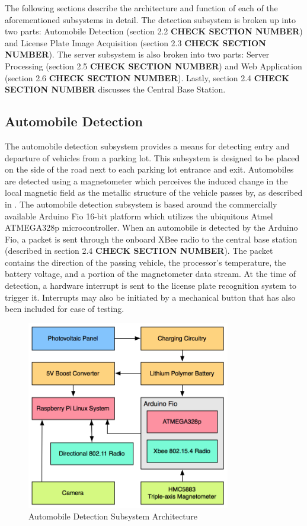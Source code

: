 \documentclass[11pt, oneside, fullpage, doublespace]{article}
\begin{document}
The following sections describe the architecture and function of each of the aforementioned subsystems in detail. The detection subsystem is broken up into two parts: Automobile Detection (section 2.2 \textbf{\color{red} CHECK SECTION NUMBER}) and License Plate Image Acquisition (section 2.3 \textbf{\color{red} CHECK SECTION NUMBER}). The server subsystem is also broken into two parts: Server Processing (section 2.5 \textbf{\color{red} CHECK SECTION NUMBER}) and Web Application (section 2.6 \textbf{\color{red} CHECK SECTION NUMBER}). Lastly, section 2.4 \textbf{\color{red} CHECK SECTION NUMBER} discusses the Central Base Station.

\subsection{Automobile Detection}
The automobile detection subsystem provides a means for detecting entry and departure of vehicles from a parking lot. This subsystem is designed to be placed on the side of the road next to each parking lot entrance and exit. Automobiles are detected using a magnetometer which perceives the induced change in the local magnetic field as the metallic structure of the vehicle passes by, as described in \cite{stillwell2013}. The automobile detection subsystem is based around the commercially available Arduino Fio 16-bit platform which utilizes the ubiquitous Atmel ATMEGA328p microcontroller. When an automobile is detected by the Arduino Fio, a packet is sent through the onboard XBee radio to the central base station (described in section 2.4 \textbf{\color{red} CHECK SECTION NUMBER}). The packet  contains the direction of the passing vehicle, the processor's temperature, the battery voltage, and a portion of the magnetometer data stream. At the time of detection, a hardware interrupt is sent to the license plate recognition system to trigger it. Interrupts may also be initiated by a mechanical button that has also been included for ease of testing.

\begin{figure}
\begin{center}
\includegraphics[width=3.5in]{autodetection}
\end{center}
\caption{Automobile Detection Subsystem Architecture}
\label{fig:autodetect}
\end{figure}
\end{document}
